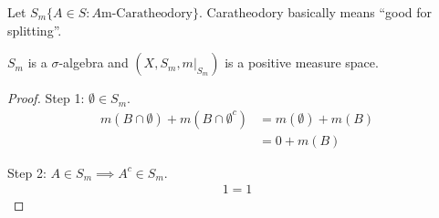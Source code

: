Let $S_m \{ A \in S : A \textrm{m-Caratheodory}\}$. Caratheodory basically means ``good for splitting''.

\begin{theorem}
	$S_m$ is a $\sigma$-algebra and $(X, S_m, m|_{S_m})$ is a positive measure space.
\end{theorem}

\begin{proof}
	Step 1: $\emptyset \in S_m$. 
	\begin{align*}
		m(B \cap \emptyset) + m(B \cap \emptyset^c) & = m(\emptyset) + m(B) \\
																								& = 0 + m(B)
	\end{align*}

	Step 2: $A \in S_m \implies A^c \in S_m$.
	\begin{align*}
	  1 = 1
	\end{align*}
\end{proof}

